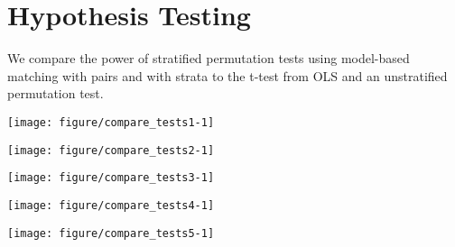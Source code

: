\documentclass[11pt]{article}\usepackage[]{graphicx}\usepackage[]{color}
\makeatletter
\def\maxwidth{ %
  \ifdim\Gin@nat@width>\linewidth
    \linewidth
  \else
    \Gin@nat@width
  \fi
}
\newenvironment{knitrout}{}{} %
\makeatother
\begin{document}
\section{Hypothesis Testing}
We compare the power of stratified permutation tests using model-based matching with pairs and with strata to the t-test from OLS and an unstratified permutation test.



\begin{knitrout}
\color{fgcolor}

{\centering \texttt{[image: figure/compare\_tests1-1]} 

}



\end{knitrout}

\begin{knitrout}
\color{fgcolor}

{\centering \texttt{[image: figure/compare\_tests2-1]} 

}



\end{knitrout}

\begin{knitrout}
\color{fgcolor}

{\centering \texttt{[image: figure/compare\_tests3-1]} 

}



\end{knitrout}

\begin{knitrout}
\color{fgcolor}

{\centering \texttt{[image: figure/compare\_tests4-1]} 

}



\end{knitrout}

\begin{knitrout}
\color{fgcolor}

{\centering \texttt{[image: figure/compare\_tests5-1]} 

}



\end{knitrout}
\end{document}
